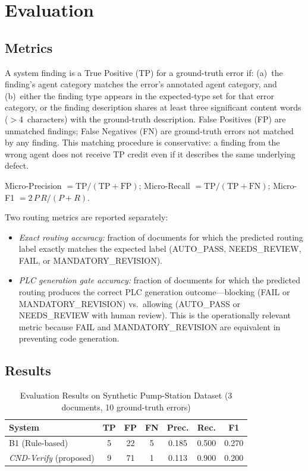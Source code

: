 \documentclass[journal]{IEEEtran}
\newcommand{\sys}{\textit{CND-Verify}}
\begin{document}
\section{Evaluation}
\label{sec:eval}

\subsection{Metrics}

A system finding is a True Positive (TP) for a ground-truth error if: (a)~the
finding's agent category matches the error's annotated agent category, and
(b)~either the finding type appears in the expected-type set for that error
category, or the finding description shares at least three significant content
words ($>$4~characters) with the ground-truth description. False Positives (FP)
are unmatched findings; False Negatives (FN) are ground-truth errors not matched
by any finding. This matching procedure is conservative: a finding from the wrong
agent does not receive TP credit even if it describes the same underlying defect.

Micro-Precision $= \text{TP}/(\text{TP}+\text{FP})$;
Micro-Recall $= \text{TP}/(\text{TP}+\text{FN})$;
Micro-F1 $= 2\,P\,R/(P+R)$.

Two routing metrics are reported separately:
\begin{itemize}
  \item \textit{Exact routing accuracy:} fraction of documents for which the
  predicted routing label exactly matches the expected label (AUTO\_PASS,
  NEEDS\_REVIEW, FAIL, or MANDATORY\_REVISION).
  \item \textit{PLC generation gate accuracy:} fraction of documents for which
  the predicted routing produces the correct PLC generation outcome---blocking
  (FAIL or MANDATORY\_REVISION) vs.\ allowing (AUTO\_PASS or NEEDS\_REVIEW with
  human review). This is the operationally relevant metric because FAIL and
  MANDATORY\_REVISION are equivalent in preventing code generation.
\end{itemize}

\subsection{Results}

\begin{table}[!t]
\caption{Evaluation Results on Synthetic Pump-Station Dataset
(3 documents, 10 ground-truth errors)}
\label{tab:results}
\centering
\renewcommand{\arraystretch}{1.3}
\begin{tabular}{lcccccc}
\toprule
\textbf{System} & \textbf{TP} & \textbf{FP} & \textbf{FN} &
\textbf{Prec.} & \textbf{Rec.} & \textbf{F1} \\
\midrule
B1 (Rule-based)   & 5  & 22 & 5  & 0.185 & 0.500 & 0.270 \\
\sys{} (proposed) & 9  & 71 & 1  & 0.113 & 0.900 & 0.200 \\
\bottomrule
\end{tabular}
\end{table}
\end{document}
